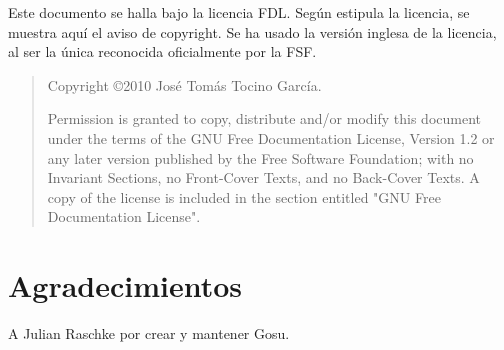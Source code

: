 \documentclass[a4paper,12pt]{scrbook}
\begin{document}




\cleardoublepage



\cleardoublepage
\bigskip
\bigskip

Este documento se halla bajo la licencia \ac{FDL}. Según estipula la
licencia, se muestra aquí el aviso de copyright. Se ha usado la
versión inglesa de la licencia, al ser la única reconocida
oficialmente por la \ac{FSF}.

\begin{quote}
  Copyright \copyright  2010 José Tomás Tocino García.
  
  Permission is granted to copy, distribute and/or modify this document
  under the terms of the GNU Free Documentation License, Version 1.2
  or any later version published by the Free Software Foundation;
  with no Invariant Sections, no Front-Cover Texts, and no Back-Cover Texts.
  A copy of the license is included in the section entitled "GNU
  Free Documentation License".
\end{quote}

\cleardoublepage

\section*{Agradecimientos}

A Julian Raschke por crear y mantener Gosu.

\cleardoublepage

\tableofcontents
\listoffigures
\listoftables

\setlength{\parskip}{1.2ex plus 0.4ex minus 0.1ex}

% 

% 
 
 
\end{document}
